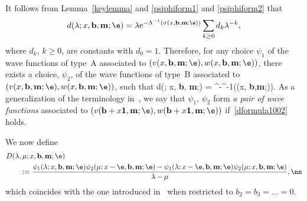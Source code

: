 It follows from Lemma~\ref{keylemma} and \eqref{psiphiform1} and \eqref{psiphiform2} that
\[
d(\lambda; x, {\bf b}, {\bf m};\e) = \lambda {\rm e}^{-\Lambda^{-1}(\sigma(x, {\bf b},{\bf m};\e))} \sum_{k\ge0} d_k \lambda^{-k},
\]
where $d_k$, $k\ge0$, are constants with $d_0=1$.
Therefore, for any choice $\psi_1$ of
the wave functions of type~A associated to $(v(x, {\bf b}, {\bf m};\e), w(x, {\bf b}, {\bf m};\e))$, there exists a choice, $\psi_2$, of
the wave functions of type~B associated to $(v(x, {\bf b}, {\bf m};\e), w(x, {\bf b}, {\bf m};\e))$, such that
\beq\label{dformula1002}
d(\lambda; x, {\bf b}, {\bf m};\e) = ^{-\Lambda^{-1}(\sigma(x, {\bf b},{\bf m};\e))}.
\eeq
As a generalization of the terminology in~\cite{Y}, we say that $\psi_1$, $\psi_2$ form {\it a pair of wave functions}
associated to $(v({\bf b}+x{\bf 1}, {\bf m};\e), w({\bf b}+x{\bf 1}, {\bf m};\e))$ if~\eqref{dformula1002} holds.

We now define
\begin{align*}%
&D(\lambda,\mu; x, {\bf b}, {\bf m};\e) \\
&\qquad{}:= \frac{\psi_1(\lambda; x, {\bf b}, {\bf m};\e) \psi_2(\mu; x-\e, {\bf b}, {\bf m};\e)
- \psi_1(\lambda; x-\e, {\bf b}, {\bf m};\e) \psi_2(\mu; x, {\bf b}, {\bf m};\e)}{\lambda-\mu}, \nn
\end{align*}
which coincides with the one introduced in~\cite{Y} when restricted to $b_2=b_3=\dots=0$.


